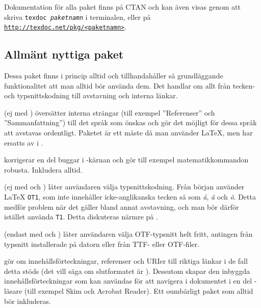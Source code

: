 \documentclass[10pt,../../a4.tex]{subfiles}
\begin{document}
Dokumentation för alla paket finns på CTAN och kan
även visas genom att skriva \texttt{texdoc \emph{paketnamn}} i terminalen,
eller på
\href{http://texdoc.net}{\nolinkurl{http://texdoc.net/pkg/<paketnamn>}}.

\subsection{Allmänt nyttiga paket}
Dessa paket finns i princip alltid och tillhandahåller så grundläggande
funktionalitet att man alltid bör använda dem. Det handlar om allt från
tecken- och typsnittskodning till avstavning och interna länkar.

\begin{description}
	\item[\pack{babel}] (ej med \XeTeX)
	översätter interna strängar (till exempel ”Referenser” och 
	”Sammanfattning”) till det språk som önskas och gör det möjligt för
	dessa språk att avstavas ordentligt. Paketet är ett måste då man
	använder \LaTeX, men har ersatts av  i \XeTeX.
	
	\item[\pack{fixltx2e}]
	korrigerar en del buggar i \LaTeXe-kärnan och gör till 
	exempel matematikkommandon robusta. Inkludera alltid.
	
	\item[\pack{fontenc}] (ej med \XeTeX och )
	låter användaren välja typsnittskodning. Från början använder \LaTeX{}
	\texttt{OT1}, som inte innehåller icke-anglikanska tecken så som
	\emph{å}, \emph{ä} och \emph{ö}. Detta medför problem när det gäller
	bland annat avstavning, och man bör därför istället använda 
	\texttt{T1}. Detta diskuteras närmre på .

	\item[\pack{fontspec}] (endast med \XeTeX och )
	låter användaren välja \textsc{OTF}-typsnitt helt fritt, antingen
	från typsnitt installerade på datorn eller från \textsc{TTF}- eller
	\textsc{OTF}-filer.
	
	\item[\pack{hyperref}]
	gör om innehållsförteckningar, referenser och URIer till riktiga
	länkar i de fall detta stöds (det vill säga om slutformatet är \PDF).
	Dessutom skapar den inbyggda innehållsförteckningar som kan användas
	för att navigera i dokumentet i en del \PDF-läsare (till exempel Skim
	och Acrobat Reader).
	Ett oumbärligt paket som alltid bör inkluderas.
	

\end{description}
\end{document}
